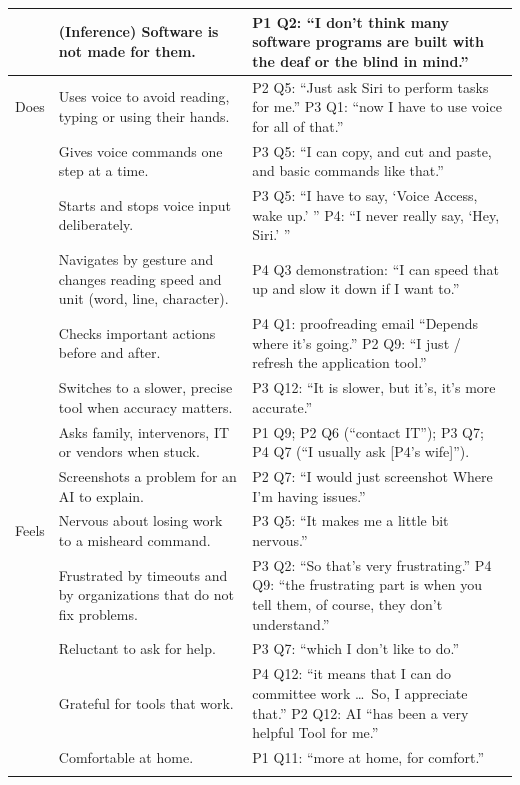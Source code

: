 \documentclass[12pt, titlepage]{article}
\begin{document}
{\begin{longtable}{>{\raggedright\arraybackslash}p{1.8cm} >{\raggedright\arraybackslash}p{5.7cm} >{\raggedright\arraybackslash}p{7.6cm}}
 & \textbf{(Inference)} Software is not made for them. & P1 Q2: ``I don't think many software programs are built with the deaf or the blind in mind.''\\
\midrule
Does & Uses voice to avoid reading, typing or using their hands. & P2 Q5: ``Just ask Siri to perform tasks for me.'' P3 Q1: ``now I have to use voice for all of that.''\\\addlinespace[3pt]
 & Gives voice commands one step at a time. & P3 Q5: ``I can copy, and cut and paste, and basic commands like that.''\\\addlinespace[3pt]
 & Starts and stops voice input deliberately. & P3 Q5: ``I have to say, `Voice Access, wake up.' '' P4: ``I never really say, `Hey, Siri.' ''\\\addlinespace[3pt]
 & Navigates by gesture and changes reading speed and unit (word, line, character). & P4 Q3 demonstration: ``I can speed that up and slow it down if I want to.''\\\addlinespace[3pt]
 & Checks important actions before and after. & P4 Q1: proofreading email ``Depends where it's going.'' P2 Q9: ``I just / refresh the application tool.''\\\addlinespace[3pt]
 & Switches to a slower, precise tool when accuracy matters. & P3 Q12: ``It is slower, but it's, it's more accurate.''\\\addlinespace[3pt]
 & Asks family, intervenors, IT or vendors when stuck. & P1 Q9; P2 Q6 (``contact IT''); P3 Q7; P4 Q7 (``I usually ask [P4's wife]'').\\\addlinespace[3pt]
 & Screenshots a problem for an AI to explain. & P2 Q7: ``I would just screenshot Where I'm having issues.''\\
\midrule
Feels & Nervous about losing work to a misheard command. & P3 Q5: ``It makes me a little bit nervous.''\\\addlinespace[3pt]
 & Frustrated by timeouts and by organizations that do not fix problems. & P3 Q2: ``So that's very frustrating.'' P4 Q9: ``the frustrating part is when you tell them, of course, they don't understand.''\\\addlinespace[3pt]
 & Reluctant to ask for help. & P3 Q7: ``which I don't like to do.''\\\addlinespace[3pt]
 & Grateful for tools that work. & P4 Q12: ``it means that I can do committee work \ldots\ So, I appreciate that.'' P2 Q12: AI ``has been a very helpful Tool for me.''\\\addlinespace[3pt]
 & Comfortable at home. & P1 Q11: ``more at home, for comfort.''\\\addlinespace[3pt]

\end{longtable}}
\end{document}
